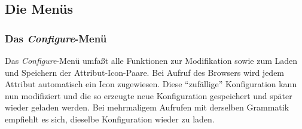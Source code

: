\subsection{Die Men\"us}

\subsubsection{Das {\it Configure}-Men\"u}

Das {\it Configure}-Men\"u umfa\ss{}t alle Funktionen zur Modifikation sowie zum Laden und Speichern der Attribut-Icon-Paare. Bei Aufruf des Browsers wird
jedem Attribut automatisch ein Icon zugewiesen. Diese "`zuf\"allige"' Konfiguration kann nun modifiziert und die so erzeugte neue Konfiguration
gespeichert und sp\"ater wieder geladen werden. Bei mehrmaligem Aufrufen mit derselben Grammatik empfiehlt es sich, dieselbe Konfiguration wieder zu
laden.

